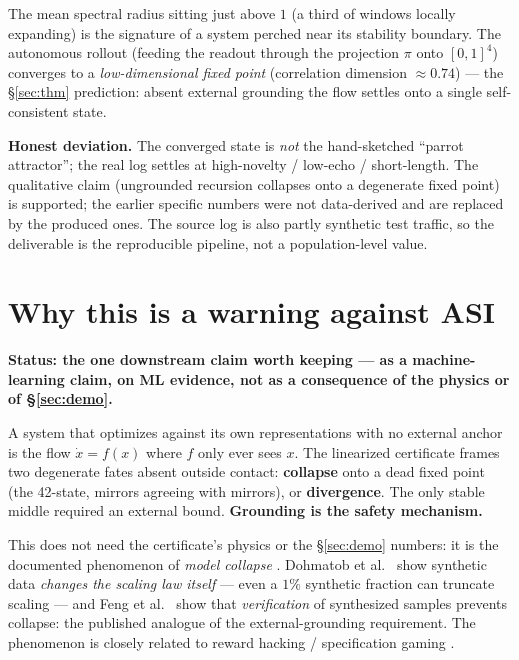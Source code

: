 \documentclass[11pt]{article}
\theoremstyle{definition}
\begin{document}
The mean spectral radius sitting just above $1$ (a third of windows locally expanding) is
the signature of a system perched near its stability boundary. The autonomous rollout
(feeding the readout through the projection $\pi$ onto $[0,1]^4$) converges to a
\emph{low-dimensional fixed point} (correlation dimension $\approx0.74$) --- the
\S\ref{sec:thm} prediction: absent external grounding the flow settles onto a single
self-consistent state.

\begin{caveatbox}
\textbf{Honest deviation.} The converged state is \emph{not} the hand-sketched ``parrot
attractor''; the real log settles at high-novelty / low-echo / short-length. The
qualitative claim (ungrounded recursion collapses onto a degenerate fixed point) is
supported; the earlier specific numbers were not data-derived and are replaced by the
produced ones. The source log is also partly synthetic test traffic, so the deliverable is
the reproducible pipeline, not a population-level value.
\end{caveatbox}

\section{Why this is a warning against ASI}
\label{sec:asi}
\begin{verifybox}
\textbf{Status: the one downstream claim worth keeping --- as a machine-learning claim, on
ML evidence, not as a consequence of the physics or of \S\ref{sec:demo}.}
\end{verifybox}
A system that optimizes against its own representations with no external anchor is the flow
$\dot x = f(x)$ where $f$ only ever sees $x$. The linearized certificate frames two
degenerate fates absent outside contact: \textbf{collapse} onto a dead fixed point (the
42-state, mirrors agreeing with mirrors), or \textbf{divergence}. The only stable middle
required an external bound. \textbf{Grounding is the safety mechanism.}

This does not need the certificate's physics or the \S\ref{sec:demo} numbers: it is the
documented phenomenon of \emph{model collapse} \cite{shumailov2024}. Dohmatob et al.\
\cite{dohmatob2024} show synthetic data \emph{changes the scaling law itself} --- even a
$1\%$ synthetic fraction can truncate scaling --- and Feng et al.\ \cite{feng2024} show that
\emph{verification} of synthesized samples prevents collapse: the published analogue of the
external-grounding requirement. The phenomenon is closely related to reward hacking /
specification gaming \cite{amodei2016,skalse2022}.
\end{document}

